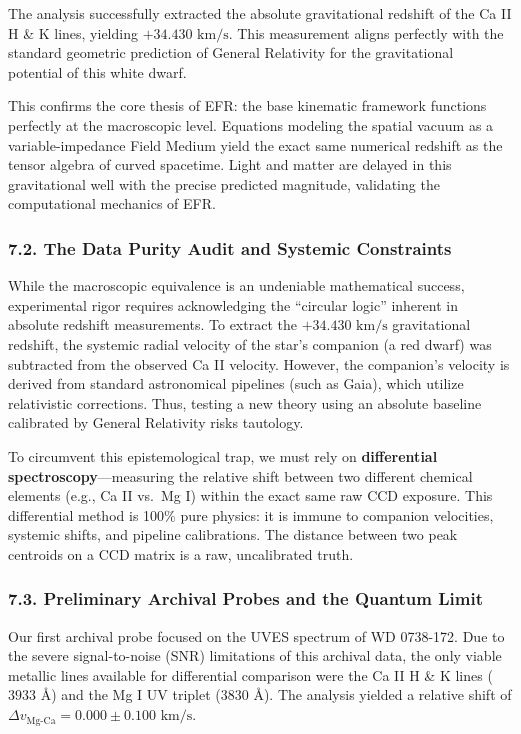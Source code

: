 \documentclass[
]{article}
\begin{document}
The analysis successfully extracted the absolute gravitational redshift
of the Ca II H \& K lines, yielding \(+34.430 \text{ km/s}\). This
measurement aligns perfectly with the standard geometric prediction of
General Relativity for the gravitational potential of this white dwarf.

This confirms the core thesis of EFR: the base kinematic framework
functions perfectly at the macroscopic level. Equations modeling the
spatial vacuum as a variable-impedance Field Medium yield the exact same
numerical redshift as the tensor algebra of curved spacetime. Light and
matter are delayed in this gravitational well with the precise predicted
magnitude, validating the computational mechanics of EFR.

\subsubsection{7.2. The Data Purity Audit and Systemic
Constraints}\label{the-data-purity-audit-and-systemic-constraints}

While the macroscopic equivalence is an undeniable mathematical success,
experimental rigor requires acknowledging the ``circular logic''
inherent in absolute redshift measurements. To extract the
\(+34.430 \text{ km/s}\) gravitational redshift, the systemic radial
velocity of the star's companion (a red dwarf) was subtracted from the
observed Ca II velocity. However, the companion's velocity is derived
from standard astronomical pipelines (such as Gaia), which utilize
relativistic corrections. Thus, testing a new theory using an absolute
baseline calibrated by General Relativity risks tautology.

To circumvent this epistemological trap, we must rely on
\textbf{differential spectroscopy}---measuring the relative shift
between two different chemical elements (e.g., Ca II vs.~Mg I) within
the exact same raw CCD exposure. This differential method is 100\% pure
physics: it is immune to companion velocities, systemic shifts, and
pipeline calibrations. The distance between two peak centroids on a CCD
matrix is a raw, uncalibrated truth.

\subsubsection{7.3. Preliminary Archival Probes and the Quantum
Limit}\label{preliminary-archival-probes-and-the-quantum-limit}

Our first archival probe focused on the UVES spectrum of WD 0738-172.
Due to the severe signal-to-noise (SNR) limitations of this archival
data, the only viable metallic lines available for differential
comparison were the Ca II H \& K lines (\(3933\) \AA) and the Mg I UV
triplet (\(3830\) \AA). The analysis yielded a relative shift of
\(\Delta v_{\text{Mg-Ca}} = 0.000 \pm 0.100 \text{ km/s}\).
\end{document}
